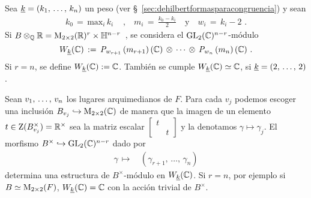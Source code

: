 Sea $\peso{k}=(\lista{k}{n})$ un peso (ver
\S~\ref{sec:dehilbertformasparacongruencia}) y sean
\begin{align*}
	k_{0} \,=\,\mathrm{max}_{i}\,k_{i} & \text{ ,}\quad
		m_{i} \,=\,\frac{k_{0} - k_{i}}{2}\quad\text{y}\quad
		w_{i} \,=\,k_{i}-2
	\text{ .}
\end{align*}
%
Si
\begin{math}
	B\otimes_{\mathbb{Q}}\mathbb{R}=\mathrm{M}_{2\times 2}(\mathbb{R})^{r}\times\mathbb{H}^{n-r}
\end{math}~,
se considera el $\mathrm{GL}_{2}(\mathbb{C})^{n-r}$-m\'{o}dulo
\begin{equation}
	\label{eq:unbxmodulo}
	W_{\underline{k}}(\mathbb{C}) \,:=\,
		\mathit{P}_{w_{r+1}}\left(m_{r+1}\right)(\mathbb{C})\,\otimes\,\cdots\,\otimes\,
		\mathit{P}_{w_{n}}\left(m_{n}\right)(\mathbb{C})
	\text{ .}
\end{equation}
%
Si $r=n$, se define $W_{\underline{k}}(\mathbb{C}):=\mathbb{C}$. Tambi\'{e}n se cumple
$W_{\underline{k}}(\mathbb{C})\simeq\mathbb{C}$, si $\underline{k}=(2,\,\dots,\,2)$.

Sean $\lista{v}{n}$ los lugares arquimedianos de $F$. Para cada $v_{j}$ podemos
escoger una inclusi\'{o}n
\begin{math}
	B_{v_{j}}\hookrightarrow\mathrm{M}_{2\times 2}(\mathbb{C})
\end{math}
de manera que la imagen de un elemento
\begin{math}
	t\in\mathrm{Z}(B_{v_{j}}^{\times})=\mathbb{R}^{\times}
\end{math}
sea la matriz escalar
\begin{math}
	\begin{bmatrix} t & \\ & t \end{bmatrix}
\end{math}
y la denotamos $\gamma\mapsto\gamma_{j}$. El morfismo
\begin{math}
	B^{\times}\hookrightarrow\mathrm{GL}_{2}(\mathbb{C})^{n-r}
\end{math}
dado por
\begin{align*}
	\gamma\,\mapsto\, & (\gamma_{r+1},\,\dots,\,\gamma_{n})
\end{align*}
%
determina una estructura de $B^{\times}$-m\'{o}dulo en $W_{\underline{k}}(\mathbb{C})$.
Si $r=n$, por ejemplo si $B\simeq\mathrm{M}_{2\times 2}(F)$,
$W_{\underline{k}}(\mathbb{C})=\mathbb{C}$ con la acci\'{o}n trivial de $B^{\times}$.
